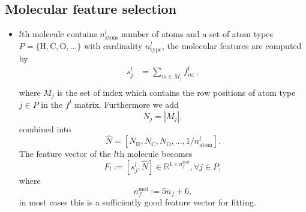 \documentclass[12pt]{article}
\begin{document}
\subsection{Molecular feature selection}
\begin{itemize}
    \item $l$th molecule contains $n^l_\text{atom}$ number of atoms and a set of atom types $P = \{\text{H}, \text{C}, \text{O}, ...\}$ with cardinality $n^l_\text{type}$,
	the molecular features are computed by
        \begin{equation}
			\label{eq:acsf}
            \begin{split}
                s^l_{j} &= \sum_{m \in M_j} f^l_{m:}, \\
            \end{split}
        \end{equation}
		where $M_j$ is the set of index which contains the row positions of atom type $j \in P$ in the $f^l$ matrix. 
		Furthermore we add
		\begin{equation}
			N_j = |M_j|,
		\end{equation}
		combined into
		\begin{equation}
			\hat{N} = [N_\text{H}, N_\text{C}, N_\text{O},..., 1/n^l_\text{atom}].
		\end{equation}
		The feature vector of the $l$th molecule becomes
		\begin{equation}
			F_l := [s^l_{j}, \hat{N} ] \in \mathbb{R}^{1 \times n_f^\text{mol}}, \forall j \in P,
        \end{equation}
		where
		\begin{equation}
    		n_f^\text{mol} := 5n_f + 6,
    	\end{equation}
		in most cases this is a sufficiently good feature vector for fitting.
		

\end{itemize}
\end{document}
